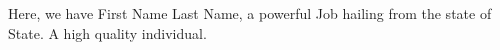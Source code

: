 Here, we have {{First Name}} {{Last Name}}, a powerful {{Job}} hailing from the state of {{State}}. A high quality individual.